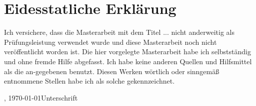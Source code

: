 
\chapter*{Eidesstatliche Erklärung}
\label{sec:EidesstatlicheErklärung}

Ich versichere, dass die Masterarbeit mit dem Titel \glqq{}...\grqq{} nicht
anderweitig als Prüfungsleistung verwendet wurde und diese Masterarbeit noch
nicht veröffentlicht worden ist. Die hier vorgelegte Masterarbeit habe ich
selbstständig und ohne fremde Hilfe abgefasst. Ich habe keine anderen Quellen und Hilfsmittel als die an-gegebenen benutzt. Diesen Werken wörtlich oder sinngemäß entnommene Stellen habe ich als solche gekennzeichnet.
\vfill

\begin{center}
\begin{minipage}{0.9\textwidth}
\ort, \today \hfill  Unterschrift
\end{minipage}
\end{center}



